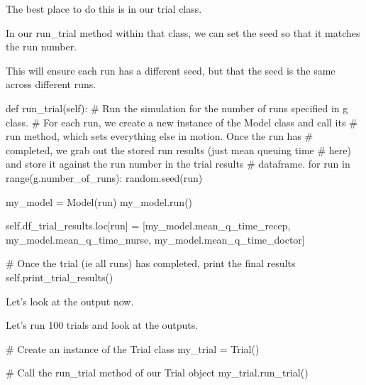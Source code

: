 \documentclass[
  letterpaper,
  DIV=11,
  numbers=noendperiod]{scrreprt}
\newenvironment{Shaded}{\begin{snugshade}}{\end{snugshade}}
\newcommand{\BuiltInTok}[1]{\textcolor[rgb]{0.00,0.23,0.31}{#1}}
\newcommand{\CommentTok}[1]{\textcolor[rgb]{0.37,0.37,0.37}{#1}}
\newcommand{\ControlFlowTok}[1]{\textcolor[rgb]{0.00,0.23,0.31}{#1}}
\newcommand{\KeywordTok}[1]{\textcolor[rgb]{0.00,0.23,0.31}{#1}}
\newcommand{\NormalTok}[1]{\textcolor[rgb]{0.00,0.23,0.31}{#1}}
\newcommand{\OperatorTok}[1]{\textcolor[rgb]{0.37,0.37,0.37}{#1}}
\newcommand{\VariableTok}[1]{\textcolor[rgb]{0.07,0.07,0.07}{#1}}
\begin{document}
The best place to do this is in our trial class.

In our run\_trial method within that class, we can set the seed so that
it matches the run number.

This will ensure each run has a different seed, but that the seed is the
same across different runs.

\begin{Shaded}
\begin{Highlighting}[]
\KeywordTok{def}\NormalTok{ run\_trial(}\VariableTok{self}\NormalTok{):}
    \CommentTok{\# Run the simulation for the number of runs specified in g class.}
    \CommentTok{\# For each run, we create a new instance of the Model class and call its}
    \CommentTok{\# run method, which sets everything else in motion.  Once the run has}
    \CommentTok{\# completed, we grab out the stored run results (just mean queuing time}
    \CommentTok{\# here) and store it against the run number in the trial results}
    \CommentTok{\# dataframe.}
    \ControlFlowTok{for}\NormalTok{ run }\KeywordTok{in} \BuiltInTok{range}\NormalTok{(g.number\_of\_runs):}
\NormalTok{        random.seed(run)}

\NormalTok{        my\_model }\OperatorTok{=}\NormalTok{ Model(run)}
\NormalTok{        my\_model.run()}

        \VariableTok{self}\NormalTok{.df\_trial\_results.loc[run] }\OperatorTok{=}\NormalTok{ [my\_model.mean\_q\_time\_recep,}
\NormalTok{                                          my\_model.mean\_q\_time\_nurse,}
\NormalTok{                                          my\_model.mean\_q\_time\_doctor]}

    \CommentTok{\# Once the trial (ie all runs) has completed, print the final results}
    \VariableTok{self}\NormalTok{.print\_trial\_results()}
\end{Highlighting}
\end{Shaded}

Let's look at the output now.

Let's run 100 trials and look at the outputs.

\begin{Shaded}
\begin{Highlighting}[]
\CommentTok{\# Create an instance of the Trial class}
\NormalTok{my\_trial }\OperatorTok{=}\NormalTok{ Trial()}

\CommentTok{\# Call the run\_trial method of our Trial object}
\NormalTok{my\_trial.run\_trial()}
\end{Highlighting}
\end{Shaded}
\end{document}
